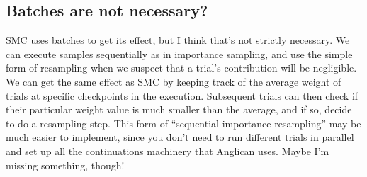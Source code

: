 \documentclass[a4paper, 11pt]{article}
\theoremstyle{definition}
\begin{document}
\subsection*{Batches are not necessary?}

SMC uses batches to get its effect, but I think that's not strictly necessary. We can execute samples sequentially as in importance sampling, and use the simple form of resampling when we suspect that a trial's contribution will be negligible. We can get the same effect as SMC by keeping track of the average weight of trials at specific checkpoints in the execution. Subsequent trials can then check if their particular weight value is much smaller than the average, and if so, decide to do a resampling step. This form of ``sequential importance resampling'' may be much easier to implement, since you don't need to run different trials in parallel and set up all the continuations machinery that Anglican uses. Maybe I'm missing something, though!



\end{document}
